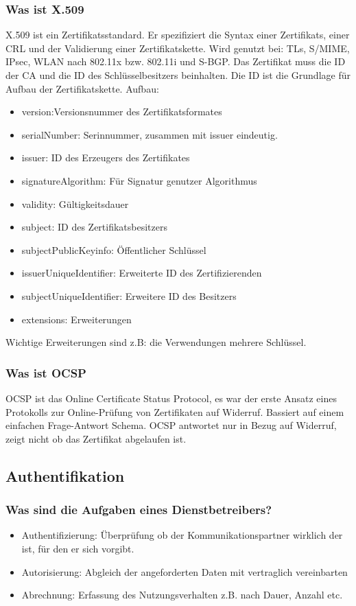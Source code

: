 	\subsubsection{Was ist X.509}
	X.509 ist ein Zertifikatsstandard. Er spezifiziert die Syntax einer Zertifikats, einer CRL und der Validierung einer Zertifikatskette. Wird genutzt bei: TLs, S/MIME, IPsec, WLAN nach 802.11x bzw. 802.11i und S-BGP.
	\newline
	Das Zertifikat muss die ID der CA und die ID des Schlüsselbesitzers beinhalten. Die ID ist die Grundlage für Aufbau der Zertifikatskette.\newline
	Aufbau: 
	\begin{itemize}
		\item version:Versionsnummer des Zertifikatsformates
		\item serialNumber: Serinnummer, zusammen mit issuer eindeutig.
		\item issuer: ID des Erzeugers des Zertifikates
		\item signatureAlgorithm: Für Signatur genutzer Algorithmus
		\item validity: Gültigkeitsdauer
		\item subject: ID des Zertifikatsbesitzers
		\item subjectPublicKeyinfo: Öffentlicher Schlüssel
		\item issuerUniqueIdentifier: Erweiterte ID des Zertifizierenden
		\item subjectUniqueIdentifier: Erweitere ID des Besitzers
		\item extensions: Erweiterungen		
	\end{itemize}
	Wichtige Erweiterungen sind z.B: die Verwendungen mehrere Schlüssel. 
	
	\subsubsection{Was ist OCSP}
	OCSP ist das Online Certificate Status Protocol, es war der erste Ansatz eines Protokolls zur Online-Prüfung von Zertifikaten auf Widerruf. Bassiert auf einem einfachen Frage-Antwort Schema.  OCSP antwortet nur in Bezug auf Widerruf, zeigt nicht ob das Zertifikat abgelaufen ist.
	
	\subsection{Authentifikation}
	\subsubsection{Was sind die Aufgaben eines Dienstbetreibers?}
	\begin{itemize}
		\item Authentifizierung: Überprüfung ob der Kommunikationspartner wirklich der ist, für den er sich vorgibt.
		\item Autorisierung: Abgleich der angeforderten Daten mit vertraglich vereinbarten
		\item Abrechnung: Erfassung des Nutzungsverhalten z.B. nach Dauer, Anzahl etc.
	\end{itemize}
	
